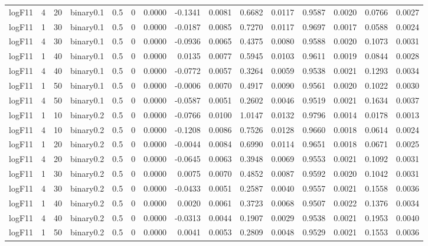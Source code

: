 \begin{longtable}{rrrrrrrrrrrrrrr}
  logF11 & 4 & 20 & binary0.1 & 0.5 & 0 & 0.0000 & -0.1341 & 0.0081 & 0.6682 & 0.0117 & 0.9587 & 0.0020 & 0.0766 & 0.0027 \\ 
  logF11 & 1 & 30 & binary0.1 & 0.5 & 0 & 0.0000 & -0.0187 & 0.0085 & 0.7270 & 0.0117 & 0.9697 & 0.0017 & 0.0588 & 0.0024 \\ 
  logF11 & 4 & 30 & binary0.1 & 0.5 & 0 & 0.0000 & -0.0936 & 0.0065 & 0.4375 & 0.0080 & 0.9588 & 0.0020 & 0.1073 & 0.0031 \\ 
  logF11 & 1 & 40 & binary0.1 & 0.5 & 0 & 0.0000 & 0.0135 & 0.0077 & 0.5945 & 0.0103 & 0.9611 & 0.0019 & 0.0844 & 0.0028 \\ 
  logF11 & 4 & 40 & binary0.1 & 0.5 & 0 & 0.0000 & -0.0772 & 0.0057 & 0.3264 & 0.0059 & 0.9538 & 0.0021 & 0.1293 & 0.0034 \\ 
  logF11 & 1 & 50 & binary0.1 & 0.5 & 0 & 0.0000 & -0.0006 & 0.0070 & 0.4917 & 0.0090 & 0.9561 & 0.0020 & 0.1022 & 0.0030 \\ 
  logF11 & 4 & 50 & binary0.1 & 0.5 & 0 & 0.0000 & -0.0587 & 0.0051 & 0.2602 & 0.0046 & 0.9519 & 0.0021 & 0.1634 & 0.0037 \\ 
  logF11 & 1 & 10 & binary0.2 & 0.5 & 0 & 0.0000 & -0.0766 & 0.0100 & 1.0147 & 0.0132 & 0.9796 & 0.0014 & 0.0178 & 0.0013 \\ 
  logF11 & 4 & 10 & binary0.2 & 0.5 & 0 & 0.0000 & -0.1208 & 0.0086 & 0.7526 & 0.0128 & 0.9660 & 0.0018 & 0.0614 & 0.0024 \\ 
  logF11 & 1 & 20 & binary0.2 & 0.5 & 0 & 0.0000 & -0.0044 & 0.0084 & 0.6990 & 0.0114 & 0.9651 & 0.0018 & 0.0671 & 0.0025 \\ 
  logF11 & 4 & 20 & binary0.2 & 0.5 & 0 & 0.0000 & -0.0645 & 0.0063 & 0.3948 & 0.0069 & 0.9553 & 0.0021 & 0.1092 & 0.0031 \\ 
  logF11 & 1 & 30 & binary0.2 & 0.5 & 0 & 0.0000 & 0.0075 & 0.0070 & 0.4852 & 0.0087 & 0.9592 & 0.0020 & 0.1042 & 0.0031 \\ 
  logF11 & 4 & 30 & binary0.2 & 0.5 & 0 & 0.0000 & -0.0433 & 0.0051 & 0.2587 & 0.0040 & 0.9557 & 0.0021 & 0.1558 & 0.0036 \\ 
  logF11 & 1 & 40 & binary0.2 & 0.5 & 0 & 0.0000 & 0.0020 & 0.0061 & 0.3723 & 0.0068 & 0.9507 & 0.0022 & 0.1376 & 0.0034 \\ 
  logF11 & 4 & 40 & binary0.2 & 0.5 & 0 & 0.0000 & -0.0313 & 0.0044 & 0.1907 & 0.0029 & 0.9538 & 0.0021 & 0.1953 & 0.0040 \\ 
  logF11 & 1 & 50 & binary0.2 & 0.5 & 0 & 0.0000 & 0.0041 & 0.0053 & 0.2809 & 0.0048 & 0.9529 & 0.0021 & 0.1553 & 0.0036 \\ 

\end{longtable}
